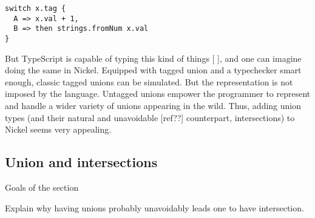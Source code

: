\documentclass{article}
\begin{document}
\begin{lstlisting}
switch x.tag {
  A => x.val + 1,
  B => then strings.fromNum x.val
}
\end{lstlisting}

But TypeScript is capable of typing this kind of things [ ], and one can imagine
doing the same in Nickel. Equipped with tagged union and a typechecker smart
enough, classic tagged unions can be simulated. But the representation is not
imposed by the language. Untagged unions empower the programmer to represent and
handle a wider variety of unions appearing in the wild. Thus, adding union types
(and their natural and unavoidable [ref??] counterpart, intersections) to Nickel
seems very appealing.

\subsection{Union and intersections}
\color{red}Goals of the section

Explain why having unions probably unavoidably leads one to have intersection.\vspace{0.5cm}\color{black}
\end{document}
